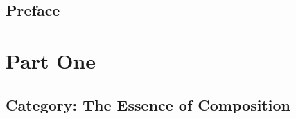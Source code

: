 
%
%
%



\frontmatter



\pagebreak



\pagebreak
\tableofcontents

\chapter*{Preface}
\label{Preface}



\mainmatter

\part*{Part One}

\chapter{Category: The Essence of Composition}\label{category-the-essence-of-composition}


